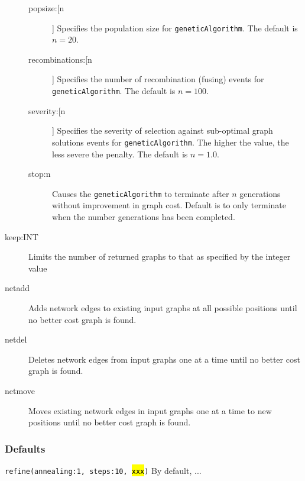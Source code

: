 \begin{description}
\begin{description}
			\item[popsize:[n]] Specifies the population size for \texttt{geneticAlgorithm}. The default is 
			$n=20$.
			
			\item[recombinations:[n]] Specifies the number of recombination (fusing) events for 
			\texttt{geneticAlgorithm}. The default is $n=100$.
			
			\item[severity:[n]] Specifies the severity of selection against sub-optimal graph solutions 
			events for \texttt{geneticAlgorithm}. The higher the value, the less severe the penalty. The 
			default is $n=1.0$.
			
			\item[stop:n] Causes the \texttt{geneticAlgorithm} to terminate after $n$ generations without 
			improvement in graph cost.  Default is to only terminate when the number generations has 
			been completed.
			\end{description}
		
		\item[keep:INT] Limits the number of returned graphs to that as specified by the integer value 
		
		\item[netadd] Adds network edges to existing input graphs at all possible positions 
		until no better cost graph is found.
			
		\item[netdel] Deletes network edges from input graphs one at a time until no better 
		cost 	graph is found.
			
		\item[netmove] Moves existing network edges in input graphs one at a time to new 
		positions 	until no better cost graph is found.
	\end{description}

	\subsubsection{Defaults}
		\texttt{refine(annealing:1, steps:10, \hl{xxx})} By default, \phyg ... 
	
